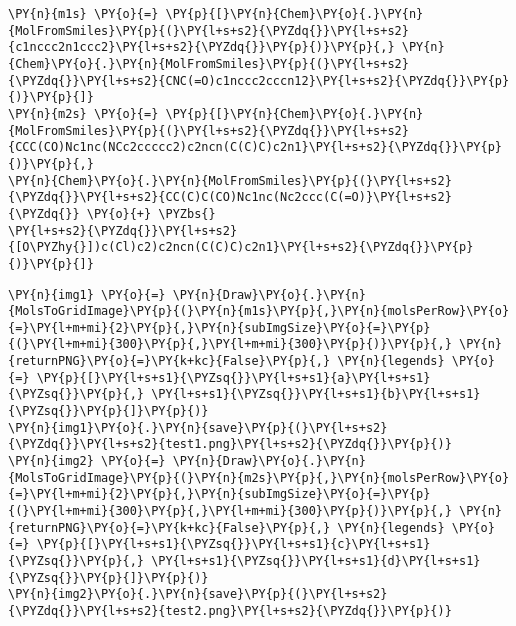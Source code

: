 \begin{tcolorbox}[breakable, size=fbox, boxrule=1pt, pad at break*=1mm,colback=cellbackground, colframe=cellborder]
\begin{Verbatim}[commandchars=\\\{\}]
\PY{n}{m1s} \PY{o}{=} \PY{p}{[}\PY{n}{Chem}\PY{o}{.}\PY{n}{MolFromSmiles}\PY{p}{(}\PY{l+s+s2}{\PYZdq{}}\PY{l+s+s2}{c1nccc2n1ccc2}\PY{l+s+s2}{\PYZdq{}}\PY{p}{)}\PY{p}{,} \PY{n}{Chem}\PY{o}{.}\PY{n}{MolFromSmiles}\PY{p}{(}\PY{l+s+s2}{\PYZdq{}}\PY{l+s+s2}{CNC(=O)c1nccc2cccn12}\PY{l+s+s2}{\PYZdq{}}\PY{p}{)}\PY{p}{]}
\PY{n}{m2s} \PY{o}{=} \PY{p}{[}\PY{n}{Chem}\PY{o}{.}\PY{n}{MolFromSmiles}\PY{p}{(}\PY{l+s+s2}{\PYZdq{}}\PY{l+s+s2}{CCC(CO)Nc1nc(NCc2ccccc2)c2ncn(C(C)C)c2n1}\PY{l+s+s2}{\PYZdq{}}\PY{p}{)}\PY{p}{,} 
\PY{n}{Chem}\PY{o}{.}\PY{n}{MolFromSmiles}\PY{p}{(}\PY{l+s+s2}{\PYZdq{}}\PY{l+s+s2}{CC(C)C(CO)Nc1nc(Nc2ccc(C(=O)}\PY{l+s+s2}{\PYZdq{}} \PY{o}{+} \PYZbs{}
\PY{l+s+s2}{\PYZdq{}}\PY{l+s+s2}{[O\PYZhy{}])c(Cl)c2)c2ncn(C(C)C)c2n1}\PY{l+s+s2}{\PYZdq{}}\PY{p}{)}\PY{p}{]}
\end{Verbatim}
\end{tcolorbox}

\begin{tcolorbox}[breakable, size=fbox, boxrule=1pt, pad at break*=1mm,colback=cellbackground, colframe=cellborder]
\begin{Verbatim}[commandchars=\\\{\}]
\PY{n}{img1} \PY{o}{=} \PY{n}{Draw}\PY{o}{.}\PY{n}{MolsToGridImage}\PY{p}{(}\PY{n}{m1s}\PY{p}{,}\PY{n}{molsPerRow}\PY{o}{=}\PY{l+m+mi}{2}\PY{p}{,}\PY{n}{subImgSize}\PY{o}{=}\PY{p}{(}\PY{l+m+mi}{300}\PY{p}{,}\PY{l+m+mi}{300}\PY{p}{)}\PY{p}{,} \PY{n}{returnPNG}\PY{o}{=}\PY{k+kc}{False}\PY{p}{,} \PY{n}{legends} \PY{o}{=} \PY{p}{[}\PY{l+s+s1}{\PYZsq{}}\PY{l+s+s1}{a}\PY{l+s+s1}{\PYZsq{}}\PY{p}{,} \PY{l+s+s1}{\PYZsq{}}\PY{l+s+s1}{b}\PY{l+s+s1}{\PYZsq{}}\PY{p}{]}\PY{p}{)}    
\PY{n}{img1}\PY{o}{.}\PY{n}{save}\PY{p}{(}\PY{l+s+s2}{\PYZdq{}}\PY{l+s+s2}{test1.png}\PY{l+s+s2}{\PYZdq{}}\PY{p}{)}
\PY{n}{img2} \PY{o}{=} \PY{n}{Draw}\PY{o}{.}\PY{n}{MolsToGridImage}\PY{p}{(}\PY{n}{m2s}\PY{p}{,}\PY{n}{molsPerRow}\PY{o}{=}\PY{l+m+mi}{2}\PY{p}{,}\PY{n}{subImgSize}\PY{o}{=}\PY{p}{(}\PY{l+m+mi}{300}\PY{p}{,}\PY{l+m+mi}{300}\PY{p}{)}\PY{p}{,} \PY{n}{returnPNG}\PY{o}{=}\PY{k+kc}{False}\PY{p}{,} \PY{n}{legends} \PY{o}{=} \PY{p}{[}\PY{l+s+s1}{\PYZsq{}}\PY{l+s+s1}{c}\PY{l+s+s1}{\PYZsq{}}\PY{p}{,} \PY{l+s+s1}{\PYZsq{}}\PY{l+s+s1}{d}\PY{l+s+s1}{\PYZsq{}}\PY{p}{]}\PY{p}{)}    
\PY{n}{img2}\PY{o}{.}\PY{n}{save}\PY{p}{(}\PY{l+s+s2}{\PYZdq{}}\PY{l+s+s2}{test2.png}\PY{l+s+s2}{\PYZdq{}}\PY{p}{)}
\end{Verbatim}
\end{tcolorbox}


